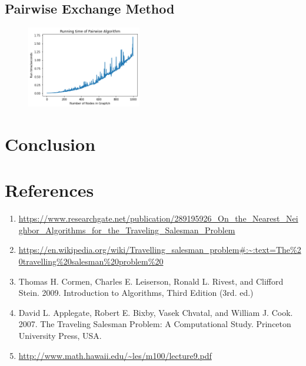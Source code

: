 \documentclass[11pt]{article}
\begin{document}
\subsection{Pairwise Exchange Method}
\begin{figure}[htp]
    \centering
    \includegraphics[width=5cm]{2opt.png}
    \label{fig:galaxy}
\end{figure}
\section{Conclusion}
\newpage
\section{References}
\begin{enumerate}
	\item \url{https://www.researchgate.net/publication/289195926_On_the_Nearest_Neighbor_Algorithms_for_the_Traveling_Salesman_Problem}
	\item \url{https://en.wikipedia.org/wiki/Travelling_salesman_problem#:~:text=The%20travelling%20salesman%20problem%20}
	\item Thomas H. Cormen, Charles E. Leiserson, Ronald L. Rivest, and Clifford Stein. 2009. Introduction to Algorithms, Third Edition (3rd. ed.)
	\item David L. Applegate, Robert E. Bixby, Vasek Chvatal, and William J. Cook. 2007. The Traveling Salesman Problem: A Computational Study. Princeton University Press, USA.
	\item\url{http://www.math.hawaii.edu/~les/m100/lecture9.pdf}
\end{enumerate}
\end{document}
